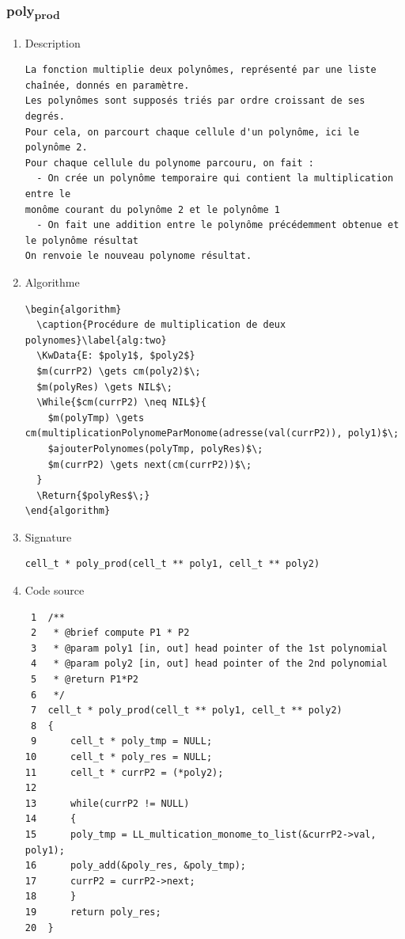 \documentclass[11pt]{article}
\begin{document}
\subsubsection{poly\textsubscript{prod}}
\label{sec:orga43fa9b}
\begin{enumerate}
\item Description
\label{sec:orgf2ae390}

\begin{verbatim}
La fonction multiplie deux polynômes, représenté par une liste chaînée, donnés en paramètre.
Les polynômes sont supposés triés par ordre croissant de ses degrés.
Pour cela, on parcourt chaque cellule d'un polynôme, ici le polynôme 2.
Pour chaque cellule du polynome parcouru, on fait :
  - On crée un polynôme temporaire qui contient la multiplication entre le
monôme courant du polynôme 2 et le polynôme 1
  - On fait une addition entre le polynôme précédemment obtenue et le polynôme résultat
On renvoie le nouveau polynome résultat.
\end{verbatim}

\item Algorithme
\label{sec:org079c91e}

\begin{verbatim}
\begin{algorithm}
  \caption{Procédure de multiplication de deux polynomes}\label{alg:two}
  \KwData{E: $poly1$, $poly2$}
  $m(currP2) \gets cm(poly2)$\;
  $m(polyRes) \gets NIL$\;
  \While{$cm(currP2) \neq NIL$}{
    $m(polyTmp) \gets cm(multiplicationPolynomeParMonome(adresse(val(currP2)), poly1)$\;
    $ajouterPolynomes(polyTmp, polyRes)$\;
    $m(currP2) \gets next(cm(currP2))$\;
  }
  \Return{$polyRes$\;}
\end{algorithm}
\end{verbatim}

\item Signature
\label{sec:org5f4a1ca}

\begin{verbatim}
cell_t * poly_prod(cell_t ** poly1, cell_t ** poly2)
\end{verbatim}

\item Code source
\label{sec:orgbe9499f}

\begin{verbatim}
 1  /** 
 2   * @brief compute P1 * P2
 3   * @param poly1 [in, out] head pointer of the 1st polynomial
 4   * @param poly2 [in, out] head pointer of the 2nd polynomial
 5   * @return P1*P2
 6   */
 7  cell_t * poly_prod(cell_t ** poly1, cell_t ** poly2)
 8  {  
 9      cell_t * poly_tmp = NULL;
10      cell_t * poly_res = NULL;
11      cell_t * currP2 = (*poly2);
12  
13      while(currP2 != NULL)
14      {
15  	poly_tmp = LL_multication_monome_to_list(&currP2->val, poly1);
16  	poly_add(&poly_res, &poly_tmp);
17  	currP2 = currP2->next;
18      }
19      return poly_res;
20  }
\end{verbatim}


\end{enumerate}
\end{document}
